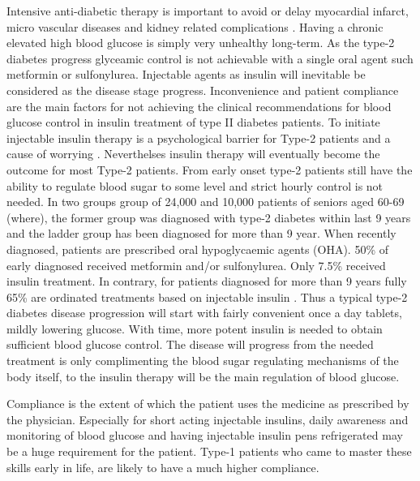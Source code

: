 Intensive anti-diabetic therapy is important to avoid or delay myocardial infarct, micro vascular diseases and kidney related complications \cite{holman,boussageon2011effect,gaede2008effect}. Having a chronic elevated high blood glucose is simply very unhealthy long-term. As the type-2 diabetes progress glyceamic control is not achievable with a single oral agent such metformin or sulfonylurea. Injectable agents as insulin will inevitable be considered as the disease stage progress. Inconvenience and patient compliance are the main factors for not achieving the clinical recommendations for blood glucose control in insulin treatment of type II diabetes patients. To initiate injectable insulin therapy is a psychological barrier for Type-2 patients and a cause of worrying \cite{korytkowski2002oral}. Neverthelses insulin therapy will eventually become the outcome for most Type-2 patients. From early onset type-2 patients still have the ability to regulate blood sugar to some level and strict hourly control is not needed. In two groups group of 24,000 and 10,000 patients of seniors aged 60-69 (where), the former group was diagnosed with type-2 diabetes within last 9 years and the ladder group has been diagnosed for more than 9 year. When recently diagnosed, patients are prescribed oral hypoglycaemic agents (OHA). 50\% of early diagnosed received metformin and/or sulfonylurea. Only 7.5\% received insulin treatment. In contrary, for patients diagnosed for more than 9 years fully 65\% are ordinated treatments based on injectable insulin \cite{Elbert2014rates}. Thus a typical type-2 diabetes disease progression will start with fairly convenient once a day tablets, mildly lowering glucose. With time, more potent insulin is needed to obtain sufficient blood glucose control. The disease will progress from the needed treatment is only complimenting the blood sugar regulating mechanisms of the body itself, to the insulin therapy will be the main regulation of blood glucose.

Compliance is the extent of which the patient uses the medicine as prescribed by the physician. Especially for short acting injectable insulins, daily awareness and monitoring of blood glucose and having injectable insulin pens refrigerated may be a huge requirement for the patient. Type-1 patients who came to master these skills early in life, are likely to have a much higher compliance.

